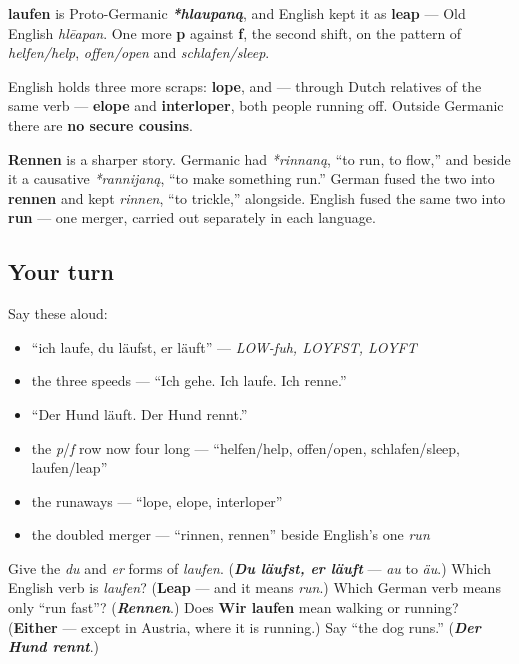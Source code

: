\begin{cousinweb}
\textbf{laufen} is Proto-Germanic \emph{\textbf{*hlaupaną}}, and English kept it as \textbf{leap} — Old English \emph{hlēapan}. One more \textbf{p} against \textbf{f}, the second shift, on the pattern of \emph{helfen/help}, \emph{offen/open} and \emph{schlafen/sleep}.

English holds three more scraps: \textbf{lope}, and — through Dutch relatives of the same verb — \textbf{elope} and \textbf{interloper}, both people running off. Outside Germanic there are \textbf{no secure cousins}.

\textbf{Rennen} is a sharper story. Germanic had \emph{*rinnaną}, \textquotedblleft{}to run, to flow,\textquotedblright{} and beside it a causative \emph{*rannijaną}, \textquotedblleft{}to make something run.\textquotedblright{} German fused the two into \textbf{rennen} and kept \emph{rinnen}, \textquotedblleft{}to trickle,\textquotedblright{} alongside. English fused the same two into \textbf{run} — one merger, carried out separately in each language.
\end{cousinweb}

\subsection*{Your turn}
Say these aloud:

\begin{itemize}
\raggedright
  \item \textquotedblleft{}ich laufe, du läufst, er läuft\textquotedblright{} — \emph{LOW-fuh, LOYFST, LOYFT}
  \item the three speeds — \textquotedblleft{}Ich gehe. Ich laufe. Ich renne.\textquotedblright{}
  \item \textquotedblleft{}Der Hund läuft. Der Hund rennt.\textquotedblright{}
  \item the \emph{p}/\emph{f} row now four long — \textquotedblleft{}helfen/help, offen/open, schlafen/sleep, laufen/leap\textquotedblright{}
  \item the runaways — \textquotedblleft{}lope, elope, interloper\textquotedblright{}
  \item the doubled merger — \textquotedblleft{}rinnen, rennen\textquotedblright{} beside English's one \emph{run}
\end{itemize}

\begin{tcolorbox}[breakable,colback=teal!4,colframe=teal!35!black,title={Before you move on}]
Give the \emph{du} and \emph{er} forms of \emph{laufen}. (\emph{\textbf{Du läufst, er läuft}} — \emph{au} to \emph{äu}.) Which English verb is \emph{laufen}? (\textbf{Leap} — and it means \emph{run}.) Which German verb means only \textquotedblleft{}run fast\textquotedblright{}? (\emph{\textbf{Rennen}}.) Does \textbf{Wir laufen} mean walking or running? (\textbf{Either} — except in Austria, where it is running.) Say \textquotedblleft{}the dog runs.\textquotedblright{} (\emph{\textbf{Der Hund rennt}}.)
\end{tcolorbox}
